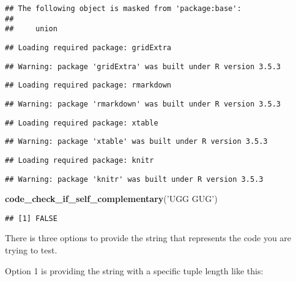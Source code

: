 \documentclass[
]{article}
\newenvironment{Shaded}{\begin{snugshade}}{\end{snugshade}}
\newcommand{\KeywordTok}[1]{\textcolor[rgb]{0.13,0.29,0.53}{\textbf{#1}}}
\newcommand{\NormalTok}[1]{#1}
\newcommand{\StringTok}[1]{\textcolor[rgb]{0.31,0.60,0.02}{#1}}
\begin{document}
\begin{verbatim}
## The following object is masked from 'package:base':
## 
##     union
\end{verbatim}

\begin{verbatim}
## Loading required package: gridExtra
\end{verbatim}

\begin{verbatim}
## Warning: package 'gridExtra' was built under R version 3.5.3
\end{verbatim}

\begin{verbatim}
## Loading required package: rmarkdown
\end{verbatim}

\begin{verbatim}
## Warning: package 'rmarkdown' was built under R version 3.5.3
\end{verbatim}

\begin{verbatim}
## Loading required package: xtable
\end{verbatim}

\begin{verbatim}
## Warning: package 'xtable' was built under R version 3.5.3
\end{verbatim}

\begin{verbatim}
## Loading required package: knitr
\end{verbatim}

\begin{verbatim}
## Warning: package 'knitr' was built under R version 3.5.3
\end{verbatim}

\begin{Shaded}
\begin{Highlighting}[]
\KeywordTok{code_check_if_self_complementary}\NormalTok{(}\StringTok{'UGG GUG'}\NormalTok{)}
\end{Highlighting}
\end{Shaded}

\begin{verbatim}
## [1] FALSE
\end{verbatim}

There is three options to provide the string that represents the code
you are trying to test.

Option 1 is providing the string with a specific tuple length like this:
\end{document}
